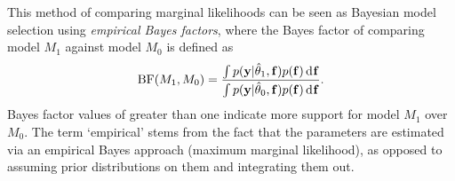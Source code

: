 \begin{remark}
  This method of comparing marginal likelihoods can be seen as Bayesian model selection using \emph{empirical Bayes factors}, where the Bayes factor of comparing model $M_1$ against model $M_0$ is defined as
  \[
    \operatorname{BF}(M_1,M_0) = \frac{\int p({\mathbf y}|\hat\theta_1,{\mathbf f})p({\mathbf f}) \operatorname{d}\hspace{0.5pt}\! {\mathbf f} }{\int p({\mathbf y}|\hat\theta_0,{\mathbf f})p({\mathbf f}) \operatorname{d}\hspace{0.5pt}\! {\mathbf f}}.
  \]
  Bayes factor values of greater than one indicate more support for model $M_1$ over $M_0$.
  The term ‘empirical’ stems from the fact that the parameters are estimated via an empirical Bayes approach (maximum marginal likelihood), as opposed to assuming prior distributions on them and integrating them out.
\end{remark}
